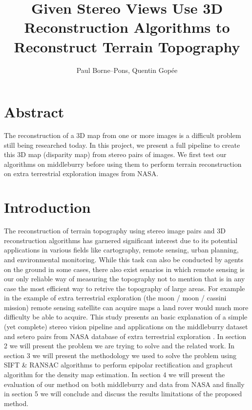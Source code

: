 \documentclass[10pt,twocolumn,letterpaper]{article}
\begin{document}
\title{
Given Stereo Views Use 3D Reconstruction Algorithms to Reconstruct Terrain Topography \\
}


\author{Paul Borne--Pons, Quentin Gopée}
\maketitle

\section{Abstract}
The reconstruction of a 3D map from one or more images is a difficult problem still being researched today. In this project, we present a full pipeline to create this 3D map (disparity map) from stereo pairs of images. We first test our algorithms on middleburry \cite{VisionMiddleburyEdu} before using them to perform terrain reconstruction on extra terrestrial exploration images from NASA\cite{beyerAmesStereoPipeline2018}.

\section{Introduction}
The reconstruction of terrain topography using stereo image pairs and 3D reconstruction algorithms has garnered significant interest due to its potential applications in various fields like cartography, remote sensing, urban planning, and environmental monitoring. While this task can also be conducted by agents on the ground in some cases, there also exist senarios in which remote sensing is our only reliable way of measuring the topography not to mention that is in any case the most efficient way to retrive the topography of large areas. For example in the example of extra terrestrial exploration (the moon / moon / cassini mission) remote sensing satellite can acquire maps a land rover would much more difficulty be able to acquire. This study presents an basic explanation of a simple (yet complete) stereo vision pipeline and applications on the middleburry\cite{VisionMiddleburyEdu} dataset and setero pairs from NASA database of extra terrestrial exploration \cite{beyerAmesStereoPipeline2018}. In section 2 we will present the problem we are trying to solve and the related work. In section 3 we will present the methodology we used to solve the problem using SIFT\cite{lindebergScaleInvariantFeature2012} \& RANSAC\cite{fischlerRandomSampleConsensus1981} algorithms to perform epipolar rectification and graphcut algorithm for the density map estimation. In section 4 we will present the evaluation of our method on both middleburry and data from NASA and finally in section 5 we will conclude and discuss the results limitations of the proposed method.
\end{document}
